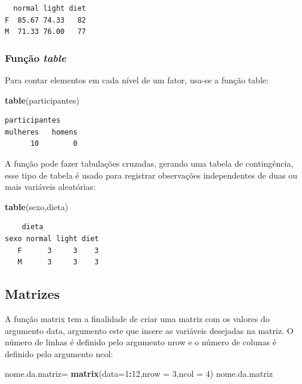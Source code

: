 \documentclass[12pt,brazil,]{book}
\newenvironment{Shaded}{\begin{snugshade}}{\end{snugshade}}
\newcommand{\DataTypeTok}[1]{\textcolor[rgb]{0.13,0.29,0.53}{#1}}
\newcommand{\DecValTok}[1]{\textcolor[rgb]{0.00,0.00,0.81}{#1}}
\newcommand{\KeywordTok}[1]{\textcolor[rgb]{0.13,0.29,0.53}{\textbf{#1}}}
\newcommand{\NormalTok}[1]{#1}
\newcommand{\OperatorTok}[1]{\textcolor[rgb]{0.81,0.36,0.00}{\textbf{#1}}}
\newcommand{\StringTok}[1]{\textcolor[rgb]{0.31,0.60,0.02}{#1}}
\begin{document}
\begin{verbatim}
  normal light diet
F  85.67 74.33   82
M  71.33 76.00   77
\end{verbatim}

\hypertarget{funcao-table}{%
\subsubsection{\texorpdfstring{Função
\emph{table}}{Função table}}\label{funcao-table}}

Para contar elementos em cada nível de um fator, usa-se a função table:

\begin{Shaded}
\begin{Highlighting}[]
\KeywordTok{table}\NormalTok{(participantes)}
\end{Highlighting}
\end{Shaded}

\begin{verbatim}
participantes
mulheres   homens 
      10        0 
\end{verbatim}

A função pode fazer tabulações cruzadas, gerando uma tabela de
contingência, esse tipo de tabela é usado para registrar observações
independentes de duas ou mais variáveis aleatórias:

\begin{Shaded}
\begin{Highlighting}[]
\KeywordTok{table}\NormalTok{(sexo,dieta)}
\end{Highlighting}
\end{Shaded}

\begin{verbatim}
    dieta
sexo normal light diet
   F      3     3    3
   M      3     3    3
\end{verbatim}

\hypertarget{matrizes}{%
\subsection{Matrizes}\label{matrizes}}

A função matrix tem a finalidade de criar uma matriz com os valores do
argumento data, argumento este que insere as variáveis desejadas na
matriz. O número de linhas é definido pelo argumento nrow e o número de
colunas é definido pelo argumento ncol:

\begin{Shaded}
\begin{Highlighting}[]
\NormalTok{nome.da.matriz=}\StringTok{ }\KeywordTok{matrix}\NormalTok{(}\DataTypeTok{data=}\DecValTok{1}\OperatorTok{:}\DecValTok{12}\NormalTok{,}\DataTypeTok{nrow =} \DecValTok{3}\NormalTok{,}\DataTypeTok{ncol =} \DecValTok{4}\NormalTok{)}
\NormalTok{nome.da.matriz}
\end{Highlighting}
\end{Shaded}
\end{document}
